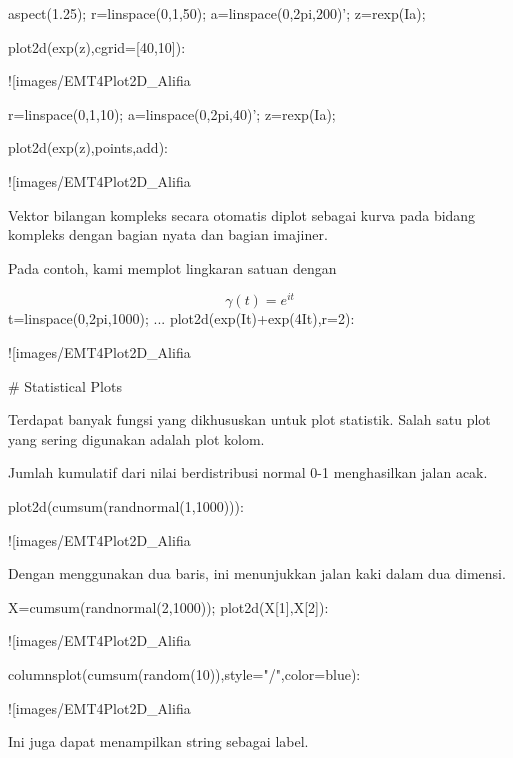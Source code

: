 \documentclass{article}
\begin{document}
\>aspect(1.25); r=linspace(0,1,50); a=linspace(0,2pi,200)'; z=r\*exp(I\*a);

\>plot2d(exp(z),cgrid=[40,10]):


![images/EMT4Plot2D_Alifia%

\>r=linspace(0,1,10); a=linspace(0,2pi,40)'; z=r\*exp(I\*a);

\>plot2d(exp(z),\>points,\>add):


![images/EMT4Plot2D_Alifia%

Vektor bilangan kompleks secara otomatis diplot sebagai kurva pada
bidang kompleks dengan bagian nyata dan bagian imajiner.


Pada contoh, kami memplot lingkaran satuan dengan


$$\gamma(t) = e^{it}$$\>t=linspace(0,2pi,1000); ...  
\>   plot2d(exp(I\*t)+exp(4\*I\*t),r=2):


![images/EMT4Plot2D_Alifia%

# Statistical Plots

Terdapat banyak fungsi yang dikhususkan untuk plot statistik. Salah
satu plot yang sering digunakan adalah plot kolom.


Jumlah kumulatif dari nilai berdistribusi normal 0-1 menghasilkan
jalan acak.


\>plot2d(cumsum(randnormal(1,1000))):


![images/EMT4Plot2D_Alifia%

Dengan menggunakan dua baris, ini menunjukkan jalan kaki dalam dua
dimensi.


\>X=cumsum(randnormal(2,1000)); plot2d(X[1],X[2]):


![images/EMT4Plot2D_Alifia%

\>columnsplot(cumsum(random(10)),style="/",color=blue):


![images/EMT4Plot2D_Alifia%

Ini juga dapat menampilkan string sebagai label.
\end{document}
